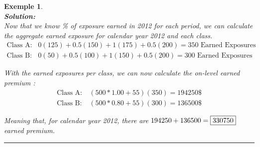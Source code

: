 \documentclass[11pt, english]{memoir}
\numberwithin{definition}{section}
\newtheorem{example}{Exemple}[section]
\newenvironment{exemple}
{
	\begin{example} \normalfont \ \\ 
	}
	{
		\hfill\rule{0.5em}{0.5em}\end{example}
}
\newenvironment{solution}
{\noindent\textbf{Solution:} \\ 
}{
}
\begin{document}
\begin{exemple}
\begin{solution}
		Now that we know \% of exposure earned in 2012 for each period, we can calculate the aggregate earned exposure for calendar year 2012 and each class.
		\begin{align*}
		\text{Class A}: \ & 0(125) + 0.5(150) + 1(175) + 0.5(200) = 350 \text{ Earned Exposures} \\
		\text{Class B}: \ & 0(50) + 0.5(100) + 1(150) + 0.5(200) = 300 \text{ Earned Exposures}
		\end{align*}
		 
		 With the earned exposures per class, we can now calculate the on-level earned premium : 
		\begin{align*}
		\text{Class A}: \ & (500*1.00 + 55)(350) = 194250\$ \\
		\text{Class B}: \ & (500*0.80 + 55)(300) = 136500\$
		\end{align*}
		
		Meaning that, for calendar year 2012, there are $ 194250 + 136500 = \fbox{330750} $ earned premium.
		\end{solution}
	\end{exemple}
	
\end{document}
